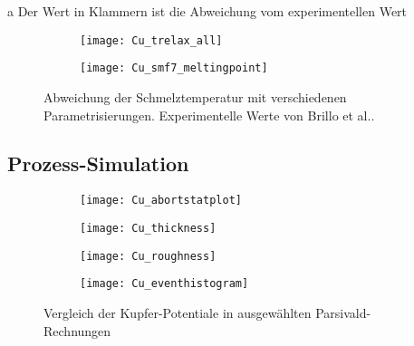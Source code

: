 \begin{table}
\begin{threeparttable}
    \begin{tablenotes}
      \item[a] Der Wert in Klammern ist die Abweichung vom experimentellen Wert
    \end{tablenotes}
  \end{threeparttable}
\end{table}

\begin{figure}
  \captionsetup[subfigure]{singlelinecheck=false}
  \def\subfigwidth{7cm}
  \begin{subfigure}[t]{\subfigwidth}
    \texttt{[image: Cu\_trelax\_all]}
  \end{subfigure}
  \hfill
  \begin{subfigure}[t]{\subfigwidth}
    \texttt{[image: Cu\_smf7\_meltingpoint]}
  \end{subfigure}
  \caption[Abweichung der Schmelztemperaturen bei Kupfer-MD]{
    Abweichung der Schmelztemperatur mit verschiedenen Parametrisierungen.
    Experimentelle Werte von Brillo et al.\cite{brillo_density_2006}.
  }
  \label{fig:copperthermo}
\end{figure}

\subsection{Prozess-Simulation}
\label{coppersimulation}

\begin{figure}
  \captionsetup[subfigure]{singlelinecheck=false}
  \def\subfigwidth{0.49\textwidth}
  \begin{subfigure}[t]{\subfigwidth}
    \texttt{[image: Cu\_abortstatplot]}
    \label{fig:copperparsivald-a}
  \end{subfigure}
  \hfill
  \begin{subfigure}[t]{\subfigwidth}
    \texttt{[image: Cu\_thickness]}
    \label{fig:copperparsivald-b}
  \end{subfigure}
  \begin{subfigure}[t]{\subfigwidth}
    \texttt{[image: Cu\_roughness]}
    \label{fig:copperparsivald-c}
  \end{subfigure}
  \hfill
  \begin{subfigure}[t]{\subfigwidth}
    \texttt{[image: Cu\_eventhistogram]}
    \label{fig:copperparsivald-d}
  \end{subfigure}
  \caption{Vergleich der Kupfer-Potentiale in ausgewählten Parsivald-Rechnungen}
  \label{fig:copperparsivald}
\end{figure}

